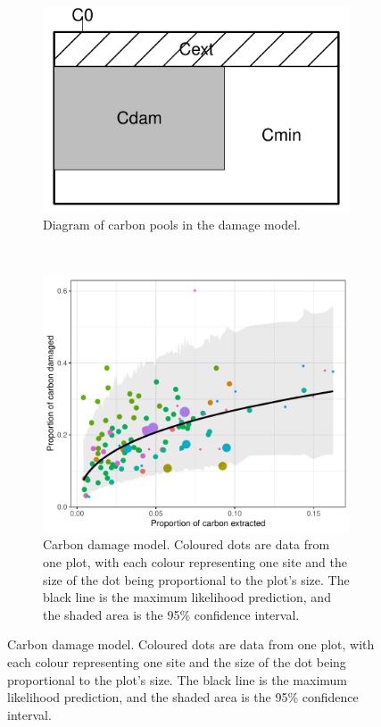 \documentclass{article}
\begin{document}
\begin{figure}
    \centering
    \begin{subfigure}[b]{0.3\textwidth}
        \includegraphics[width=\linewidth]{graphs/schemaDam.pdf}
        \caption{Diagram of carbon pools in the damage model.}\label{fig:schemaDam}
    \end{subfigure}
    ~ 
    \begin{subfigure}[b]{0.55\textwidth}
    \includegraphics[width=\linewidth]{graphs/damModel.pdf}
    \caption{Carbon damage model. Coloured dots are data from one plot, with each colour representing one site and the size of the dot being proportional to the plot's size. The black line is the maximum likelihood prediction, and the shaded area is the 95\% confidence interval.}\label{fig:damModel}
    \end{subfigure}
\end{figure}
\end{document}
